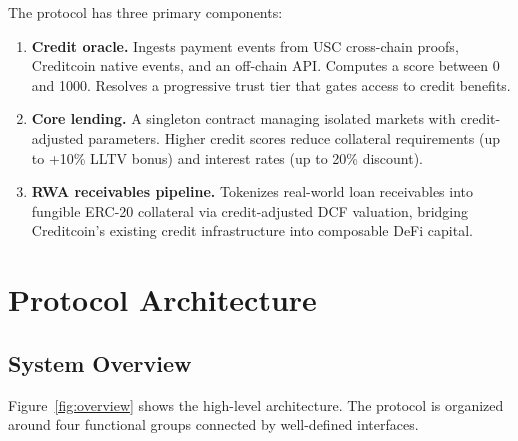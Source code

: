 \documentclass[11pt,a4paper]{article}
\begin{document}
The protocol has three primary components:

\begin{enumerate}
\item \textbf{Credit oracle.} Ingests payment events from USC cross-chain proofs, Creditcoin native events, and an off-chain API. Computes a score between 0 and 1000. Resolves a progressive trust tier that gates access to credit benefits.
\item \textbf{Core lending.} A singleton contract managing isolated markets with credit-adjusted parameters. Higher credit scores reduce collateral requirements (up to +10\% LLTV bonus) and interest rates (up to 20\% discount).
\item \textbf{RWA receivables pipeline.} Tokenizes real-world loan receivables into fungible ERC-20 collateral via credit-adjusted DCF valuation, bridging Creditcoin's existing credit infrastructure into composable DeFi capital.
\end{enumerate}

\section{Protocol Architecture}

\subsection{System Overview}

Figure~\ref{fig:overview} shows the high-level architecture. The protocol is organized around four functional groups connected by well-defined interfaces.
\end{document}
